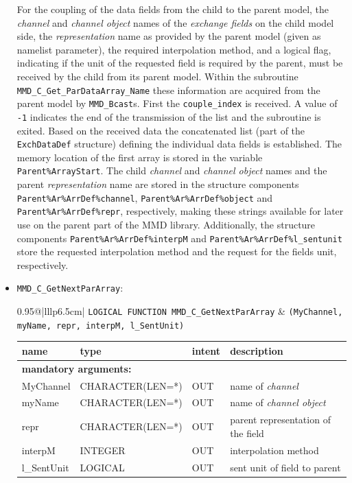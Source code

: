 \documentclass[twoside]{article}
\begin{document}
\begin{itemize}
For the coupling of the data fields from the child to the parent model, the
 {\it channel} and {\it channel object} names of the {\it exchange
 fields} on the child model side, the {\it representation} name as provided
 by the parent model (given as namelist parameter), the required
 interpolation method, and a logical flag, indicating if the unit of the
 requested field is required by the parent, must be received by the
 child from its parent model. Within the subroutine 
\verb|MMD_C_Get_ParDataArray_Name| these information are acquired from
 the parent model by \verb|MMD_Bcast|s.
First the \verb|couple_index| is received. A value of \verb|-1| indicates the
end of the transmission of the list and the subroutine is exited.
Based on the received data the concatenated list (part of
the \verb|ExchDataDef| structure) defining the individual data fields
is established. 
The memory location of the first array is stored in the variable 
\verb|Parent%ArrayStart|. The child {\it channel} and {\it channel object}
 names and the parent {\it representation} name are stored in the structure 
components \verb|Parent%Ar%ArrDef%channel|,  
\verb|Parent%Ar%ArrDef%object| 
and \verb|Parent%Ar%ArrDef%repr|, respectively, making these strings
available for later use on the parent part of the MMD library.
Additionally, the structure components \verb|Parent%Ar%ArrDef%interpM|
and \verb|Parent%Ar%ArrDef%l_sentunit| store the requested interpolation
method and the request for the fields unit, respectively.

\item \verb|MMD_C_GetNextParArray|:\\
\vspace*{-0.3cm}

\begin{tabular*}{0.95\textwidth}{@{\extracolsep\fill}|lllp{6.5cm}|}
\hline
{}
{\tt LOGICAL FUNCTION MMD\_C\_GetNextParArray} &
{\tt (MyChannel, myName, repr, interpM, l\_SentUnit)}\\
\hline
\end{tabular*}
\begin{tabular*}{0.95\textwidth}{@{\extracolsep\fill}|lllp{6.5cm}|}
name & type & intent & description\\
\hline
\multicolumn{4}{|l|}{\bf mandatory arguments:}\\
 MyChannel & CHARACTER(LEN=*) & OUT & name of {\it channel}  \\
myName     &  CHARACTER(LEN=*) & OUT & name of {\it channel object} \\
repr       & CHARACTER(LEN=*)  & OUT  & parent representation of the field \\
interpM    &  INTEGER  & OUT & interpolation method \\
l\_SentUnit & LOGICAL  & OUT & sent unit of field to parent \\
\hline
\end{tabular*}
\smallskip


\end{itemize}
\end{document}

